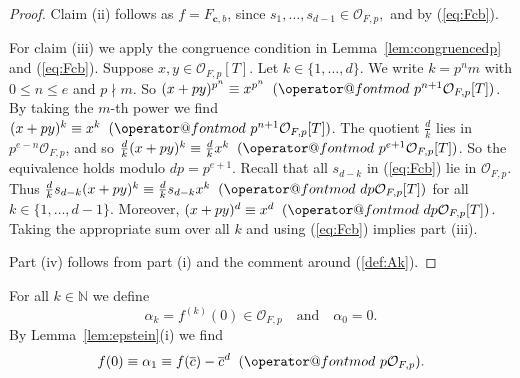 \documentclass[12pt,oneside,a4]{amsart}
\makeatletter
\newcommand{\IN}{\mathbb{N}}
\newcommand{\cO}{\mathcal{O}}
\numberwithin{maincounter}{section}
\numberwithin{equation}{section}
\def\imod#1{\allowbreak\mkern10mu({\operator@font mod}\,\,#1)}
\makeatother
\begin{document}
\begin{proof}
  Claim  (ii) follows as
  $f=F_{\mathbf{c},b}$, since $s_1,\ldots,s_{d-1}\in \cO_{F,p},$
  and by (\ref{eq:Fcb}).

  For claim (iii) we apply the congruence condition in
  Lemma~\ref{lem:congruencedp} and (\ref{eq:Fcb}). Suppose
  $x,y\in\cO_{F,p}[T]$. Let $k\in
  \{1,\ldots,d\}$. We write $k=p^n m$
  with $0\le n\le e$ and $p\nmid m$. So 
  $(x+py)^{p^n} \equiv  x^{p^n} \imod{ p^{n+1} \cO_{F,p}[T]}$.
  By taking  the $m$-th power we find
    $(x+py)^{k} \equiv  x^k \imod{ p^{n+1} \cO_{F,p}[T]}$. The quotient
    $\frac dk$ lies in $p^{e-n}\cO_{F,p}$, and so 
  $\frac dk (x+py)^{k} \equiv  \frac dk x^k \imod{ p^{e+1}
    \cO_{F,p}[T]}$.
  So the equivalence holds modulo $dp=p^{e+1}$. 
  Recall that all $s_{d-k}$ in (\ref{eq:Fcb}) lie in $\cO_{F,p}$.
  Thus
  $\frac dk s_{d-k} (x+py)^{k} \equiv \frac  dk s_{d-k} x^k \imod{ dp
    \cO_{F,p}[T]}$ for all $k\in \{1,\ldots,d-1\}$. Moreover,
  $(x+py)^d \equiv x^d \imod{dp\cO_{F,p}[T]}$.
  Taking the appropriate sum over all
  $k$  and using (\ref{eq:Fcb}) implies part (iii).

  Part (iv) follows from part (i) and the comment around (\ref{def:Ak}). 
\end{proof}


For all $k\in\IN$ we define
\begin{equation}
  \label{def:alphak}
  \alpha_k = f^{(k)}(0) \in \cO_{F,p} \quad\text{and}\quad \alpha_0 = 0.
\end{equation}
By Lemma~\ref{lem:epstein}(i) we find
\begin{equation*}
  f(0)\equiv   \alpha_1 \equiv f(\overline c) - \overline c^d \imod{p\cO_{F,p}}. 
\end{equation*}
\end{document}
